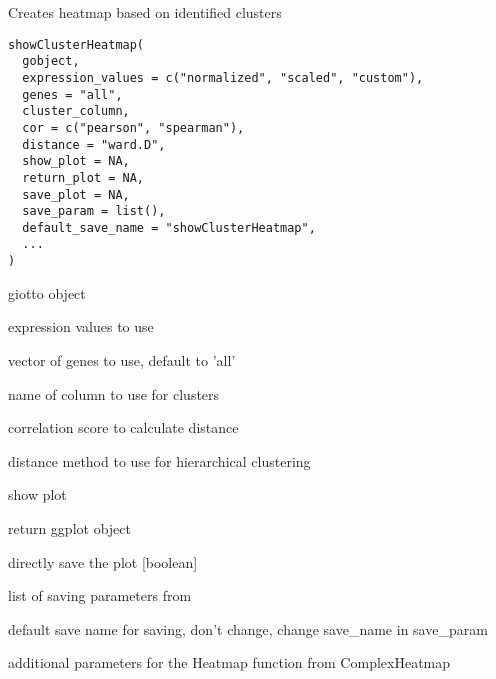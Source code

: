 \documentclass[a4paper]{book}
\begin{document}
%
\begin{Description}\relax
Creates heatmap based on identified clusters
\end{Description}
%
\begin{Usage}
\begin{verbatim}
showClusterHeatmap(
  gobject,
  expression_values = c("normalized", "scaled", "custom"),
  genes = "all",
  cluster_column,
  cor = c("pearson", "spearman"),
  distance = "ward.D",
  show_plot = NA,
  return_plot = NA,
  save_plot = NA,
  save_param = list(),
  default_save_name = "showClusterHeatmap",
  ...
)
\end{verbatim}
\end{Usage}
%
\begin{Arguments}
\begin{ldescription}
\item[\code{gobject}] giotto object

\item[\code{expression\_values}] expression values to use

\item[\code{genes}] vector of genes to use, default to 'all'

\item[\code{cluster\_column}] name of column to use for clusters

\item[\code{cor}] correlation score to calculate distance

\item[\code{distance}] distance method to use for hierarchical clustering

\item[\code{show\_plot}] show plot

\item[\code{return\_plot}] return ggplot object

\item[\code{save\_plot}] directly save the plot [boolean]

\item[\code{save\_param}] list of saving parameters from 

\item[\code{default\_save\_name}] default save name for saving, don't change, change save\_name in save\_param

\item[\code{...}] additional parameters for the Heatmap function from ComplexHeatmap
\end{ldescription}
\end{Arguments}
\end{document}
